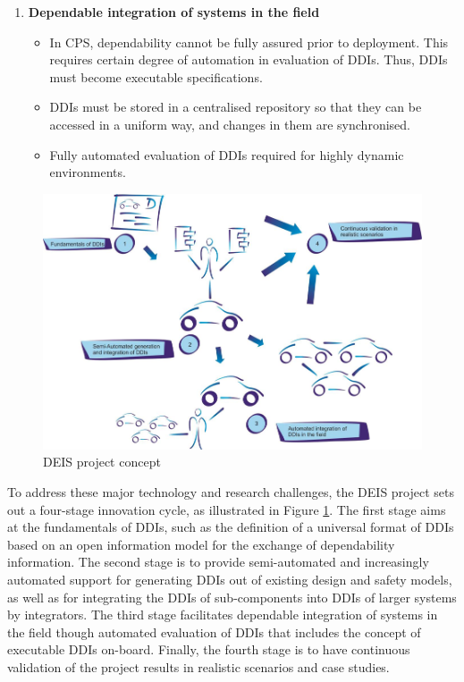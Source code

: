 \begin{enumerate}
	\item \textbf{Dependable integration of systems in the field}
		\begin{itemize}
			\item In CPS, dependability cannot be fully assured prior to deployment. This requires certain degree of automation in evaluation of DDIs. Thus, DDIs must become executable specifications.
			\item DDIs must be stored in a centralised repository so that they can be accessed in a uniform way, and changes in them are synchronised.
			\item Fully automated evaluation of DDIs required for highly dynamic environments.
		\end{itemize}
\end{enumerate}

\begin{figure}[ht!]
	\centering
	\includegraphics[width=1\linewidth]{./fig/proj_concept.png}
	\caption{DEIS project concept}
	\label{fig:proj_concept}
\end{figure}

To address these major technology and research challenges, the DEIS project sets out a four-stage innovation cycle, as illustrated in Figure \ref{fig:proj_concept}. The first stage aims at the fundamentals of DDIs, such as the definition of a universal format of DDIs based on an open information model for the exchange of dependability information. The second stage is to provide semi-automated and increasingly automated support for generating DDIs out of existing design and safety models, as well as for integrating the DDIs of sub-components into DDIs of larger systems by integrators. The third stage facilitates dependable integration of systems in the field though automated evaluation of DDIs that includes the concept of executable DDIs on-board. Finally, the fourth stage is to have continuous validation of the project results in realistic scenarios and case studies.



